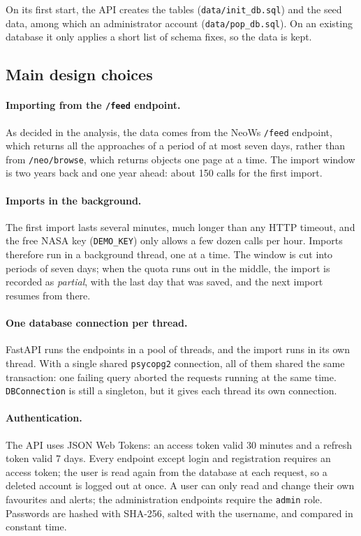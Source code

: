 On its first start, the API creates the tables (\texttt{data/init\_db.sql}) and the seed data,
among which an administrator account (\texttt{data/pop\_db.sql}). On an existing database it only
applies a short list of schema fixes, so the data is kept.

\subsection{Main design choices}

\paragraph{Importing from the \texttt{/feed} endpoint.} As decided in the analysis, the data comes
from the NeoWs \texttt{/feed} endpoint, which returns all the approaches of a period of at most
seven days, rather than from \texttt{/neo/browse}, which returns objects one page at a time. The
import window is two years back and one year ahead: about 150 calls for the first import.

\paragraph{Imports in the background.} The first import lasts several minutes, much longer than
any HTTP timeout, and the free NASA key (\texttt{DEMO\_KEY}) only allows a few dozen calls per
hour. Imports therefore run in a background thread, one at a time. The window is cut into periods
of seven days; when the quota runs out in the middle, the import is recorded as \emph{partial},
with the last day that was saved, and the next import resumes from there.

\paragraph{One database connection per thread.} FastAPI runs the endpoints in a pool of threads,
and the import runs in its own thread. With a single shared \texttt{psycopg2} connection, all of
them shared the same transaction: one failing query aborted the requests running at the same
time. \texttt{DBConnection} is still a singleton, but it gives each thread its own connection.

\paragraph{Authentication.} The API uses JSON Web Tokens: an access token valid 30 minutes and a
refresh token valid 7 days. Every endpoint except login and registration requires an access
token; the user is read again from the database at each request, so a deleted account is
logged out at once. A user can only read and change their own favourites and alerts; the
administration endpoints require the \texttt{admin} role. Passwords are hashed with SHA-256,
salted with the username, and compared in constant time.

